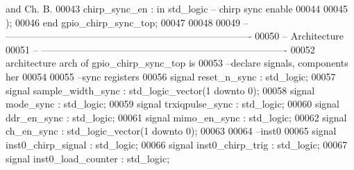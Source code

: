 \begin{DoxyCode}
{       and Ch. B. }
00043         \textcolor{vhdlchar}{chirp_sync_en}           \textcolor{vhdlchar}{:} \textcolor{keywordflow}{in} \textcolor{comment}{std\_logic}\textcolor{keyword}{  -- chirp sync enable}
00044      
00045         \textcolor{vhdlchar}{)};
00046 \textcolor{keywordflow}{end} \textcolor{vhdlchar}{gpio\_chirp\_sync\_top};
00047 
00048 
00049 \textcolor{keyword}{-- ----------------------------------------------------------------------------}
00050 \textcolor{keyword}{-- Architecture}
00051 \textcolor{keyword}{-- ----------------------------------------------------------------------------}
00052 \textcolor{keywordflow}{architecture} arch \textcolor{keywordflow}{of} gpio_chirp_sync_top is
00053 \textcolor{keyword}{--declare signals,  components her}
00054 
00055 \textcolor{keyword}{--sync registers}
00056 \textcolor{keywordflow}{signal} \textcolor{vhdlchar}{reset_n_sync}           \textcolor{vhdlchar}{:} \textcolor{comment}{std\_logic};
00057 \textcolor{keywordflow}{signal} \textcolor{vhdlchar}{sample_width_sync}      \textcolor{vhdlchar}{:} \textcolor{comment}{std\_logic\_vector}\textcolor{vhdlchar}{(}\textcolor{vhdllogic}{}\textcolor{vhdllogic}{1} \textcolor{keywordflow}{downto} \textcolor{vhdllogic}{}\textcolor{vhdllogic}{0}\textcolor{vhdlchar}{)}; 
00058 \textcolor{keywordflow}{signal} \textcolor{vhdlchar}{mode_sync}              \textcolor{vhdlchar}{:} \textcolor{comment}{std\_logic};
00059 \textcolor{keywordflow}{signal} \textcolor{vhdlchar}{trxiqpulse_sync}        \textcolor{vhdlchar}{:} \textcolor{comment}{std\_logic}; 
00060 \textcolor{keywordflow}{signal} \textcolor{vhdlchar}{ddr_en_sync}            \textcolor{vhdlchar}{:} \textcolor{comment}{std\_logic}; 
00061 \textcolor{keywordflow}{signal} \textcolor{vhdlchar}{mimo_en_sync}           \textcolor{vhdlchar}{:} \textcolor{comment}{std\_logic};
00062 \textcolor{keywordflow}{signal} \textcolor{vhdlchar}{ch_en_sync}             \textcolor{vhdlchar}{:} \textcolor{comment}{std\_logic\_vector}\textcolor{vhdlchar}{(}\textcolor{vhdllogic}{}\textcolor{vhdllogic}{1} \textcolor{keywordflow}{downto} \textcolor{vhdllogic}{}\textcolor{vhdllogic}{0}\textcolor{vhdlchar}{)};
00063 
00064 \textcolor{keyword}{--inst0}
00065 \textcolor{keywordflow}{signal} \textcolor{vhdlchar}{inst0_chirp_signal}       \textcolor{vhdlchar}{:} \textcolor{comment}{std\_logic};
00066 \textcolor{keywordflow}{signal} \textcolor{vhdlchar}{inst0_chirp_trig}         \textcolor{vhdlchar}{:} \textcolor{comment}{std\_logic};
00067 \textcolor{keywordflow}{signal} \textcolor{vhdlchar}{inst0_load_counter}     \textcolor{vhdlchar}{:} \textcolor{comment}{std\_logic};

\end{DoxyCode}

